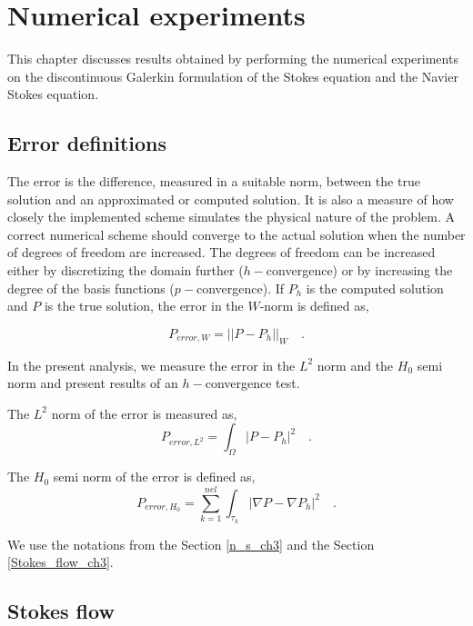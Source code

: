 \documentclass[a4paper,openany]{book}
\begin{document}
\chapter{Numerical experiments}

This chapter discusses results obtained by performing the numerical experiments on the discontinuous Galerkin formulation of the Stokes equation and the Navier Stokes equation.

\section{Error definitions}

The error is the difference, measured in a suitable norm, between the true solution and an approximated or computed solution. It is also a measure of how closely the implemented scheme simulates the physical nature of the problem. A correct numerical scheme should converge to the actual solution when the number of degrees of freedom are increased. The degrees of freedom can be increased either by discretizing the domain further ($h-$convergence) or by increasing the degree of the basis functions ($p-$convergence). If $P_h$ is the computed solution and $P$ is the true solution, the error in the $W$-norm is defined as,

\begin{equation} \label{error_definition}
P_{error,W} = ||P - P_h||_{W} \quad \mathrm{.}
\end{equation}

In the present analysis, we measure the error in the $L^2$ norm and the $H_0$ semi norm and present results of an $h-$convergence test.

The $L^2$ norm of the error is measured as,\begin{equation}
P_{error,L^2} = \int_{\Omega} |P - P_h|^2 \quad \mathrm{.}
\end{equation}

The $H_0$ semi norm of the error is defined as,\begin{equation}
P_{error,H_0} = \sum_{k=1}^{nel} \int_{\tau_k} |\nabla P - \nabla P_h|^2 \quad \mathrm{.}
\end{equation}

We use the notations from the Section \ref{n_s_ch3} and the Section \ref{Stokes_flow_ch3}.

\section{Stokes flow}\label{Stokes-ch5}
\end{document}
